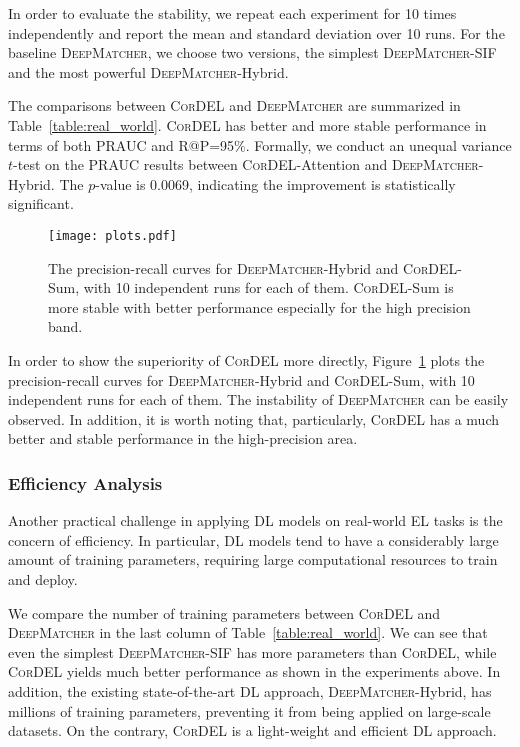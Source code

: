 \documentclass[conference]{IEEEtran}
\begin{document}
In order to evaluate the stability, we repeat each experiment for 10 times independently and report the mean and standard deviation over 10 runs. For the baseline \textsc{DeepMatcher}, we choose two versions, the simplest \textsc{DeepMatcher}-SIF and the most powerful \textsc{DeepMatcher}-Hybrid.

The comparisons between \textsc{CorDEL} and \textsc{DeepMatcher} are summarized in Table~\ref{table:real_world}. \textsc{CorDEL} has better and more stable performance in terms of both PRAUC and R@P=95$\%$. Formally, we conduct an unequal variance $t$-test on the PRAUC results between \textsc{CorDEL}-Attention and \textsc{DeepMatcher}-Hybrid. The $p$-value is 0.0069, indicating the improvement is statistically significant.

\begin{figure}
	\centering
	\texttt{[image: plots.pdf]}
	\caption{The precision-recall curves for \textsc{DeepMatcher}-Hybrid and \textsc{CorDEL}-Sum, with 10 independent runs for each of them. \textsc{CorDEL}-Sum is more stable with better performance especially for the high precision band.}
	\label{fig:plots}
\end{figure}

In order to show the superiority of \textsc{CorDEL} more directly, Figure~\ref{fig:plots} plots the precision-recall curves for \textsc{DeepMatcher}-Hybrid and \textsc{CorDEL}-Sum, with 10 independent runs for each of them. The instability of \textsc{DeepMatcher} can be easily observed. In addition, it is worth noting that, particularly, \textsc{CorDEL} has a much better and stable performance in the high-precision area.

\subsubsection{Efficiency Analysis}\label{sec:efficiency}

Another practical challenge in applying DL models on real-world EL tasks is the concern of efficiency. In particular, DL models tend to have a considerably large amount of training parameters, requiring large computational resources to train and deploy.

We compare the number of training parameters between \textsc{CorDEL} and \textsc{DeepMatcher} in the last column of Table~\ref{table:real_world}. We can see that even the simplest \textsc{DeepMatcher}-SIF has more parameters than \textsc{CorDEL}, while \textsc{CorDEL} yields much better performance as shown in the experiments above. In addition, the existing state-of-the-art DL approach, \textsc{DeepMatcher}-Hybrid, has millions of training parameters, preventing it from being applied on large-scale datasets. On the contrary, \textsc{CorDEL} is a light-weight and efficient DL approach.
\end{document}
